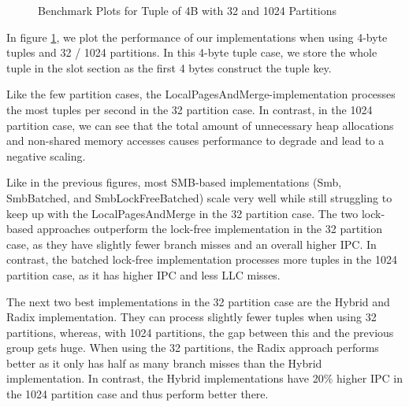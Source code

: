 \begin{figure}[h]
  \centering
  \begin{subfigure}{.49\textwidth}
    \centering
    \resizebox{\linewidth}{!}{}
  \end{subfigure}
  \begin{subfigure}{.49\textwidth}
    \centering
    \resizebox{\linewidth}{!}{}
  \end{subfigure}
  \begin{subfigure}{\textwidth}
    \centering
    \resizebox{\linewidth}{!}{}
  \end{subfigure}
  \caption[Shuffle Benchmark Plots for Tuple of 4B with 32 and 1024 Partitions]{Benchmark Plots for Tuple of 4B with 32 and 1024 Partitions}
  \label{plot-shuffle-4B-32-1024}
\end{figure}

In figure \ref{plot-shuffle-4B-32-1024}, we plot the performance of our implementations when using 4-byte tuples and 32 / 1024 partitions.
In this 4-byte tuple case, we store the whole tuple in the slot section as the first 4 bytes construct the tuple key.

Like the few partition cases, the LocalPagesAndMerge-implementation processes the most tuples per second in the 32 partition case.
In contrast, in the 1024 partition case, we can see that the total amount of unnecessary heap allocations and non-shared memory accesses causes performance to degrade and lead to a negative scaling.

Like in the previous figures, most \ac{SMB}-based implementations (Smb, SmbBatched, and SmbLockFreeBatched) scale very well while still struggling to keep up with the LocalPagesAndMerge in the 32 partition case.
The two lock-based approaches outperform the lock-free implementation in the 32 partition case, as they have slightly fewer branch misses and an overall higher \ac{IPC}.
In contrast, the batched lock-free implementation processes more tuples in the 1024 partition case, as it has higher \ac{IPC} and less \ac{LLC} misses.

The next two best implementations in the 32 partition case are the Hybrid and Radix implementation.
They can process slightly fewer tuples when using 32 partitions, whereas, with 1024 partitions, the gap between this and the previous group gets huge.
When using the 32 partitions, the Radix approach performs better as it only has half as many branch misses than the Hybrid implementation.
In contrast, the Hybrid implementations have 20\% higher \ac{IPC} in the 1024 partition case and thus perform better there.

